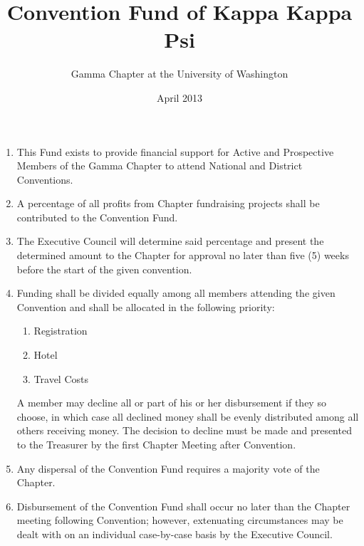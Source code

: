 \documentclass[11pt]{article}
\begin{document}
\title{Convention Fund of Kappa Kappa Psi}
\author{Gamma Chapter at the University of Washington}
\date{April 2013}
\maketitle


\begin{enumerate}[label=\bfseries Article \Roman*]
  \item
    This Fund exists to provide financial support for Active and Prospective Members of the Gamma Chapter to attend National and District Conventions.
  \item
    A percentage of all profits from Chapter fundraising projects shall be contributed to the Convention Fund.
  
  \item
    The Executive Council will determine said percentage and present the determined amount to the Chapter for approval no later than five (5) weeks before the start of the given convention.

  \item
    Funding shall be divided equally among all members attending the given Convention and shall be allocated in the following priority:
    \begin{enumerate}[label=\alph*)]
      \item Registration
      \item Hotel
      \item Travel Costs
    \end{enumerate}
    A member may decline all or part of his or her disbursement if they so choose, in which case all declined money shall be evenly distributed among all others receiving money.
    The decision to decline must be made and presented to the Treasurer by the first Chapter Meeting after Convention.
  
  \item
    Any dispersal of the Convention Fund requires a majority vote of the Chapter.
  
  \item
    Disbursement of the Convention Fund shall occur no later than the Chapter meeting following Convention; however, extenuating circumstances may be dealt with on an individual case-by-case basis by the Executive Council.
\end{enumerate}
\end{document}
